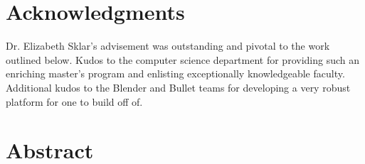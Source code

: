 \documentclass{book}[11pt]
\newcommand\todo[1]{\textcolor{red}{\textbf{{\tt TODO: #1}}}}
\begin{document}

  \newpage
  
  
  
  \section*{Acknowledgments}
  
  Dr. Elizabeth Sklar's advisement was outstanding and pivotal to the work outlined below. Kudos to the computer science department for providing such an enriching master's program and enlisting exceptionally knowledgeable faculty. Additional kudos to the Blender and Bullet teams for developing a very robust platform for one to build off of.  

  \newpage
  
  
  \section*{Abstract}
  
\end{document}
